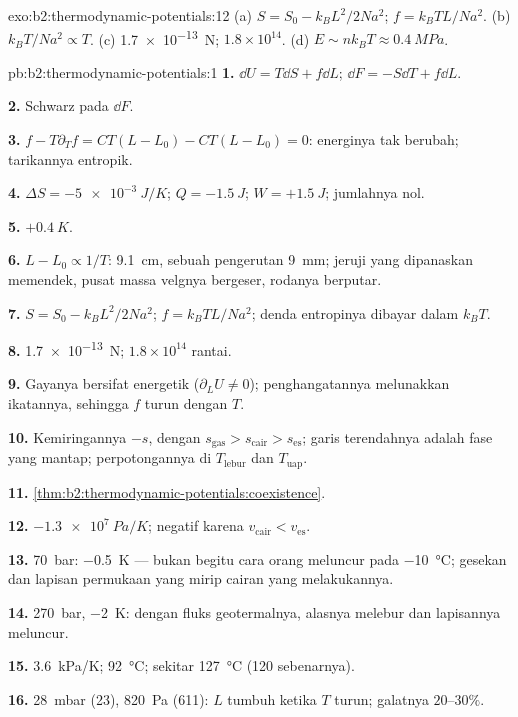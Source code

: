 \begin{solution}{exo:b2:thermodynamic-potentials:12}
(a) $S = S_0 - k_BL^2/2Na^2$; $f = k_BTL/Na^2$. (b) $k_BT/Na^2 \propto T$. (c)
\qty{1.7e-13}{N}; $1.8 \times 10^{14}$. (d) $E \sim nk_BT \approx \qty{0.4}{MPa}$.
\end{solution}

\begin{solution}{pb:b2:thermodynamic-potentials:1}
\textbf{1.} $\dd U = T\dd S + f\dd L$; $\dd F = -S\dd T + f\dd L$.

\textbf{2.} Schwarz pada $\dd F$.

\textbf{3.} $f - T\partial_Tf = CT(L - L_0) - CT(L - L_0) = 0$: energinya
tak berubah; tarikannya entropik.

\textbf{4.} $\Delta S = \qty{-5e-3}{J/K}$; $Q = \qty{-1.5}{J}$; $W = +\qty{1.5}{J}$; jumlahnya
nol.

\textbf{5.} $+\qty{0.4}{K}$.

\textbf{6.} $L - L_0 \propto 1/T$: \qty{9.1}{cm}, sebuah pengerutan \qty{9}{mm}; jeruji
yang dipanaskan memendek, pusat massa velgnya bergeser, rodanya
berputar.

\textbf{7.} $S = S_0 - k_BL^2/2Na^2$; $f = k_BTL/Na^2$; denda entropinya
dibayar dalam $k_BT$.

\textbf{8.} \qty{1.7e-13}{N}; $1.8 \times 10^{14}$ rantai.

\textbf{9.} Gayanya bersifat energetik ($\partial_LU \ne 0$); penghangatannya melunakkan
ikatannya, sehingga $f$ turun dengan $T$.

\textbf{10.} Kemiringannya $-s$, dengan $s_{\text{gas}} > s_{\text{cair}} > s_{\text{es}}$; garis
terendahnya adalah fase yang mantap; perpotongannya di $T_{\text{lebur}}$ dan $T_{\text{uap}}$.

\textbf{11.} \cref{thm:b2:thermodynamic-potentials:coexistence}.

\textbf{12.} $\qty{-1.3e7}{Pa/K}$; negatif karena $v_{\text{cair}} < v_{\text{es}}$.

\textbf{13.} \qty{70}{bar}: \qty{-0.5}{K} --- bukan begitu cara orang meluncur pada
\qty{-10}{\celsius}; gesekan dan lapisan permukaan yang mirip cairan yang melakukannya.

\textbf{14.} \qty{270}{bar}, \qty{-2}{K}: dengan fluks geotermalnya,
alasnya melebur dan lapisannya meluncur.

\textbf{15.} \qty{3.6}{kPa/K}; \qty{92}{\celsius}; sekitar \qty{127}{\celsius}
(\qty{120}{} sebenarnya).

\textbf{16.} \qty{28}{mbar} (\qty{23}{}), \qty{820}{Pa} (\qty{611}{}): $L$ tumbuh ketika $T$
turun; galatnya $20$--$30\%$.


\end{solution}

